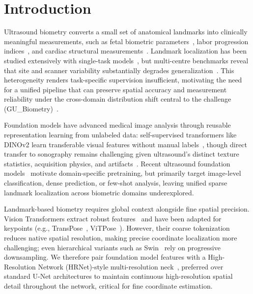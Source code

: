 \documentclass[runningheads]{llncs}
\begin{document}
\section{Introduction}
Ultrasound biometry converts a small set of anatomical landmarks into clinically meaningful measurements, such as fetal biometric parameters~\cite{salomon2019isuog}, labor progression indices~\cite{ghi2018isuog}, and cardiac structural measurements~\cite{mitchell2019comprehensive}. Landmark localization has been studied extensively with single-task models~\cite{avisdris2022biometrynet,bai2026iugc,smistad2020real,yim2024assessment}, but multi-centre benchmarks reveal that site and scanner variability substantially degrades generalization~\cite{bai2026beyond,divece2026multicentre}. This heterogeneity renders task-specific supervision insufficient, motivating the need for a unified pipeline that can preserve spatial accuracy and measurement reliability under the cross-domain distribution shift central to the challenge (GU\_Biometry)~\cite{gu_biometry,deng2026baseline}.

Foundation models have advanced medical image analysis through reusable representation learning from unlabeled data: self-supervised transformers like DINOv2 learn transferable visual features without manual labels~\cite{oquab2023dinov2}, though direct transfer to sonography remains challenging given ultrasound's distinct texture statistics, acquisition physics, and artifacts~\cite{guan2022domain,wang2021deep}. Recent ultrasound foundation models~\cite{jiao2024usfm,ambsdorf2025general,maani2025fetalclip,jiang2025ultrafedfm} motivate domain-specific pretraining, but primarily target image-level classification, dense prediction, or few-shot analysis, leaving unified sparse landmark localization across biometric domains underexplored.

Landmark-based biometry requires global context alongside fine spatial precision. Vision Transformers extract robust features~\cite{dosovitskiy2021image,oquab2023dinov2} and have been adapted for keypoints (e.g., TransPose~\cite{yang2021transpose}, ViTPose~\cite{xu2022vitpose}). However, their coarse tokenization reduces native spatial resolution, making precise coordinate localization more challenging; even hierarchical variants such as Swin~\cite{liu2021swin} rely on progressive downsampling. We therefore pair foundation model features with a High-Resolution Network (HRNet)-style multi-resolution neck~\cite{sun2019hrnet}, preferred over standard U-Net architectures to maintain continuous high-resolution spatial detail throughout the network, critical for fine coordinate estimation.
\end{document}
